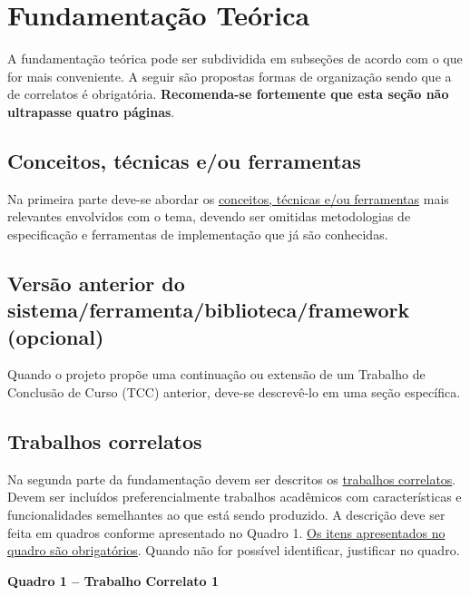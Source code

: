 \section{Fundamentação Teórica}\label{sec:fundamentacao-teorica}

A fundamentação teórica pode ser subdividida em subseções de acordo com
o que for mais conveniente. A seguir são propostas formas de organização
sendo que a de correlatos é obrigatória. \textbf{Recomenda-se fortemente
que esta seção não ultrapasse quatro páginas}.

\subsection{Conceitos, técnicas e/ou ferramentas}\label{subsec:conceitos-tecnicas-ferramentas}

Na primeira parte deve-se abordar os \ul{conceitos, técnicas e/ou
ferramentas} mais relevantes envolvidos com o tema, devendo ser omitidas
metodologias de especificação e ferramentas de implementação que já são
conhecidas.

\subsection{Versão anterior do sistema/ferramenta/biblioteca/framework
(opcional)}\label{subsec:versao-anterior}

Quando o projeto propõe uma continuação ou extensão de um Trabalho de
Conclusão de Curso (TCC) anterior, deve-se descrevê-lo em uma seção
específica.

\subsection{Trabalhos correlatos}\label{subsec:trabalhos-correlatos}

Na segunda parte da fundamentação devem ser descritos os \ul{trabalhos
correlatos}. Devem ser incluídos preferencialmente trabalhos acadêmicos
com características e funcionalidades semelhantes ao que está sendo
produzido. A descrição deve ser feita em quadros conforme apresentado no
Quadro 1. \ul{Os itens apresentados no quadro são obrigatórios}. Quando
não for possível identificar, justificar no quadro.

\begin{center}\textbf{Quadro 1 -- Trabalho Correlato 1}\end{center}

